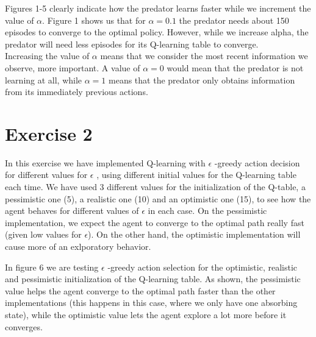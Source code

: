 \documentclass[a4paper,11pt]{article}
\begin{document}
Figures 1-5 clearly indicate how the predator learns faster while we increment the value of $\alpha$. Figure 1 shows us that for $\alpha = 0.1$ the predator needs about 150 episodes to converge to the optimal policy. However, while we increase alpha, the predator will need less episodes for its Q-learning table to converge. \\
Increasing the value of $\alpha$ means that we consider the most recent information we observe, more important. A value of $\alpha = 0$ would mean that the predator is not learning at all, while $\alpha = 1$ means that the predator only obtains information from its immediately previous actions. 
 
\section*{Exercise 2}

In this exercise we have implemented Q-learning with $\epsilon$ -greedy action decision for different values for $\epsilon$ , using different initial values for the Q-learning table each time. We have used 3 different values for the initialization of the Q-table, a pessimistic one (5), a realistic one (10) and an optimistic one (15), to see how the agent behaves for different values of $\epsilon$ in each case. On the pessimistic implementation, we expect the agent to converge to the optimal path really fast (given low values for $\epsilon$). On the other hand, the optimistic implementation will cause more of an exlporatory behavior.


In figure 6 we are testing $\epsilon$ -greedy action selection for the optimistic, realistic and pessimistic initialization of the Q-learning table. As shown, the pessimistic value helps the agent converge to the optimal path faster than the other implementations (this happens in this case, where we only have one absorbing state), while the optimistic value lets the agent explore a lot more before it converges.
\end{document}
